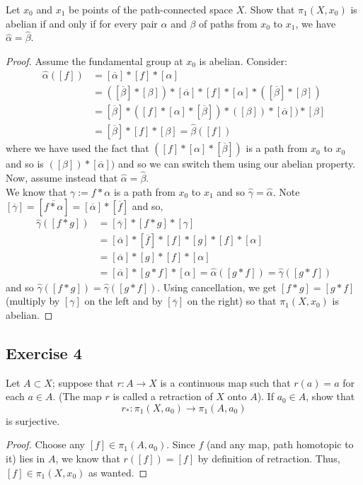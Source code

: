 \documentclass{article}
\begin{document}
Let $x_0$ and $x_1$ be points of the path-connected space $X$. Show that $\pi_1(X,x_0)$ is abelian if and only if for every pair $\alpha$ and $\beta$ of paths from $x_0$ to $x_1$, we have
$\hat{\alpha} = \hat{\beta}$.
\begin{proof}
	Assume the fundamental group at $x_0$ is abelian. Consider:
	\begin{align*}
		\hat{\alpha}([f]) &= [\overline{\alpha}] * [f] * [\alpha] \\
			&= ([\overline{\beta}] * [\beta]) * [\overline{\alpha}] * [f] * [\alpha] * ([\overline{\beta}] * [\beta]) \\
			&= [\overline{\beta}] * ([f] * [\alpha] * [\overline{\beta}]) * ([\beta]) * [\overline{\alpha}]) * [\beta] \\
			&= [\overline{\beta}] * [f] * [\beta] = \hat{\beta}([f])
	\end{align*}
	where we have used the fact that $([f] * [\alpha] * [\overline{\beta}])$ is a path from $x_0$ to $x_0$ and so is $([\beta]) * [\overline{\alpha}])$ and so we can switch them using our
	abelian property. Now, assume instead that $\hat{\alpha} = \hat{\beta}$.\\
	
	We know that $\gamma := f * \alpha$ is a path from $x_0$ to $x_1$ and so $\hat{\gamma} = \hat{\alpha}$. Note $[\overline{\gamma}] = [\overline{f * \alpha}] = [\overline{\alpha}] * [\overline{f}]$
	and so,
	\begin{align*}
		\hat{\gamma}([f * g]) &= [\overline{\gamma}] * [f * g] * [\gamma] \\
			&= [\overline{\alpha}] * [\overline{f}] * [f] * [g] * [f] * [\alpha] \\
			&= [\overline{\alpha}] * [g] * [f] * [\alpha] \\
			&= [\overline{\alpha}] * [g * f] * [\alpha] = \hat{\alpha}([g * f]) = \hat{\gamma}([g * f])
	\end{align*}
	and so $\hat{\gamma}([f * g]) = \hat{\gamma}([g * f])$. Using cancellation, we get $[f * g] = [g * f]$ (multiply by $[\gamma]$ on the left and by $[\overline{\gamma}]$ on the right) 
	so that $\pi_1(X,x_0)$ is abelian.
\end{proof}

\subsection*{Exercise 4}

Let $A\subset X$; suppose that $r: A\to X$ is a continuous map such that $r(a) = a$ for each $a\in A$. (The map $r$ is called a retraction of $X$ onto $A$). If $a_0\in A$, show that
\[ r_*: \pi_1(X,a_0) \to \pi_1(A,a_0) \]
is surjective.
\begin{proof}
	Choose any $[f] \in \pi_1(A,a_0)$. Since $f$ (and any map, path homotopic to it) lies in $A$, we know that $r([f]) = [f]$ by definition of retraction. Thus, $[f]\in \pi_1(X,x_0)$ as wanted.
\end{proof}
\end{document}
